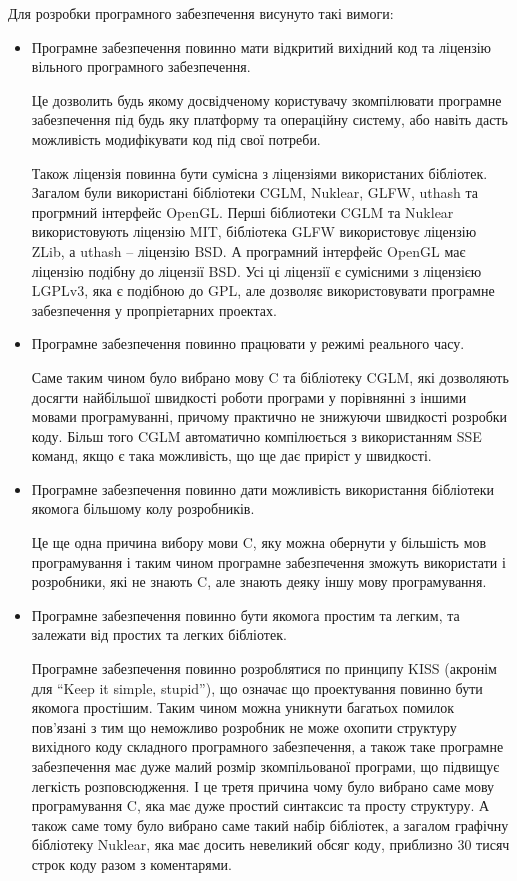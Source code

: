 \documentclass[14pt,a4paper]{extarticle}
\theoremstyle{definition}
\renewcommand{\[}{\begin{singlespace}\begin{equation*}}
\renewcommand{\]}{\end{equation*}\end{singlespace}}
\begin{document}
Для розробки програмного забезпечення висунуто такі вимоги:
\begin{itemize}
\item Програмне забезпечення повинно мати відкритий вихідний код та ліцензію вільного програмного забезпечення.

Це дозволить будь якому досвідченому користувачу зкомпілювати програмне забезпечення під будь яку платформу та операційну систему, або навіть дасть можливість модифікувати код під свої потреби.

Також ліцензія повинна бути сумісна з ліцензіями використаних бібліотек. Загалом були використані бібліотеки CGLM, Nuklear, GLFW, uthash та прогрмний інтерфейс OpenGL. Перші біблиотеки CGLM та Nuklear використовують ліцензію MIT, бібліотека GLFW використовує ліцензію ZLib, а uthash -- ліцензію BSD. А програмний інтерфейс OpenGL має ліцензію подібну до ліцензії BSD. Усі ці ліцензії є сумісними з ліцензією LGPLv3, яка є подібною до GPL, але дозволяє використовувати програмне забезпечення у пропріетарних проектах.

\item Програмне забезпечення повинно працювати у режимі реального часу.

Саме таким чином було вибрано мову C та бібліотеку CGLM, які дозволяють досягти найбільшої швидкості роботи програми у порівнянні з іншими мовами програмуванні, причому практично не знижуючи швидкості розробки коду. Більш того CGLM автоматично компілюється з використанням SSE команд, якщо є така можливість, що ще дає приріст у швидкості.

\item Програмне забезпечення повинно дати можливість використання бібліотеки якомога більшому колу розробників.

Це ще одна причина вибору мови C, яку можна обернути у більшість мов програмування і таким чином програмне забезпечення зможуть використати і розробники, які не знають C, але знають деяку іншу мову програмування.

\item Програмне забезпечення повинно бути якомога простим та легким, та залежати від простих та легких бібліотек.

Програмне забезпечення повинно розроблятися по принципу KISS (акронім для ``Keep it simple, stupid''), що означає що проектування повинно бути якомога простішим. Таким чином можна уникнути багатьох помилок пов'язані з тим що неможливо розробник не може охопити структуру вихідного коду складного програмного забезпечення, а також таке програмне забезпечення має дуже малий розмір зкомпільованої програми, що підвищує легкість розповсюдження. І це третя причина чому було вибрано саме мову програмування C, яка має дуже простий синтаксис та просту структуру. А також саме тому було вибрано саме такий набір бібліотек, а загалом графічну бібліотеку Nuklear, яка має досить невеликий обсяг коду, приблизно 30 тисяч строк коду разом з коментарями.
\end{itemize}
\end{document}
